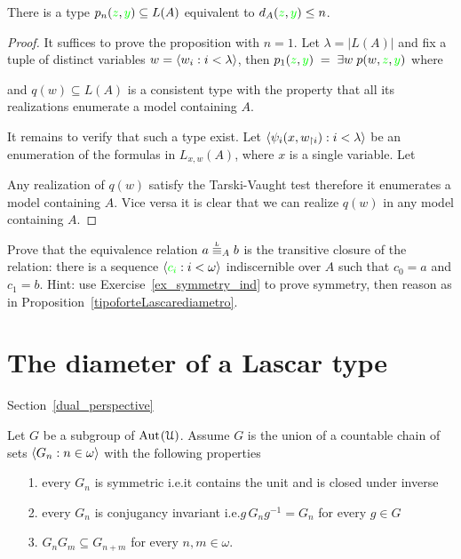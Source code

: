 \begin{proposition}\label{prop_Lascar_distance_type_def}
There is a type $p_n({\color{green} z},{\color{green} y})\subseteq L(A)$ equivalent to $d_A({\color{green} z},{\color{green} y})\le n$.  
\end{proposition}
\begin{proof}
It suffices to prove the proposition with $n=1$.
Let $\lambda=|L(A)|$ and fix a tuple of distinct variables $w=\langle w_i:i<\lambda\rangle$, then $p_1({\color{green} z},{\color{green} y})\;=\;\exists w\;p(w,{\color{green} z},{\color{green} y})$ where


and $q(w)\subseteq L(A)$ is a consistent type with the property that all its realizations enumerate a model containing $A$.

It remains to verify that such a type exist.
Let $\langle\psi_i(x,w_{\restriction i}):i<\lambda\rangle$ be an enumeration of the formulas in $L_{x,w}(A)$, where $x$ is a single variable.
Let 


Any realization of $q(w)$ satisfy the Tarski-Vaught test therefore it enumerates a model containing $A$.
Vice versa it is clear that we can realize $q(w)$ in any model containing $A$.
\end{proof}

\begin{exercise}\label{ex_Lstp_indiscernibles}
  Prove that the equivalence relation $a\stackrel{\smash{\scalebox{.5}{\rm L}}}{\equiv}_Ab$ is the transitive closure of the relation: there is a sequence $\langle{\color{green}c_i}:i<\omega\rangle$ indiscernible over $A$ such that $c_0=a$ and $c_1=b$.
  Hint: use Exercise~\ref{ex_symmetry_ind} to prove symmetry, then reason as in Proposition~\ref{tipoforteLascarediametro}.
\end{exercise}

\section{The diameter of a Lascar type}\label{newelski}

Section~\ref{dual_perspective}

Let $G$ be a subgroup of ${\rm Aut\kern.15ex}(\EuScript U)$.
Assume $G$ is the union of a countable chain of sets $\langle G_n:n\in\omega\rangle$ with the following properties
\begin{itemize}
  \item[1.] every $G_n$ is symmetric i.e.\@ it contains the unit and is closed under inverse
  \item[2.] every $G_n$ is conjugancy invariant i.e.\@ $g\,G_ng^{-1}=G_n$ for every $g\in G$
  \item[3.] $G_nG_m\subseteq  G_{n+m}$ for every $n,m\in\omega$.
\end{itemize}

